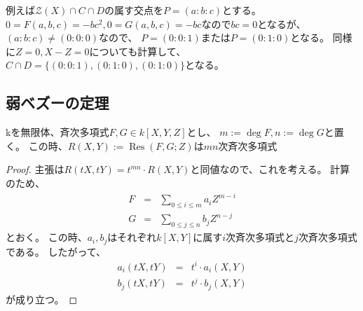 \documentclass[a4paper]{jsarticle}
\newcommand{\Res}{\operatorname{Res}}
\begin{document}
    例えば$\mathcal{Z}(X) \cap C \cap D$の属す交点を$P=(a:b:c)$とする。
    $0=F(a,b,c)=-bc^2, 0=G(a,b,c)=-bc$なので$bc=0$となるが、$(a:b:c)\neq(0:0:0)$なので、
    $P=(0:0:1)$または$P=(0:1:0)$となる。
    同様に$Z=0, X-Z=0$についても計算して、$C \cap D=\{ (0:0:1),(0:1:0),(0:1:0) \}$となる。

    \subsection{弱ベズーの定理}
    \begin{Lemma}
        kを無限体、斉次多項式$F,G \in k[X,Y,Z]$とし、
        $m:=\deg F, n:=\deg G$と置く。
        この時、$R(X,Y):=\Res(F,G; Z)$は$mn$次斉次多項式
    \end{Lemma}
    \begin{proof}
        主張は$R(tX,tY)=t^{mn} \cdot R(X,Y)$と同値なので、これを考える。
        計算のため、
        \begin{eqnarray*}
            F&=&\sum_{0 \leq i \leq m}{a_{i} Z^{m-i}} \\
            G&=&\sum_{0 \leq j \leq n}{b_{j} Z^{n-j}}
        \end{eqnarray*}
        とおく。
        この時、$a_{i}, b_{j}$はそれぞれ$k[X,Y]$に属す$i$次斉次多項式と$j$次斉次多項式である。
        したがって、
        \begin{eqnarray*}
            a_{i}(tX,tY)&=&t^{i} \cdot a_{i}(X,Y) \\
            b_{j}(tX,tY)&=&t^{j} \cdot b_{j}(X,Y)
        \end{eqnarray*}
        が成り立つ。


\end{proof}
\end{document}
